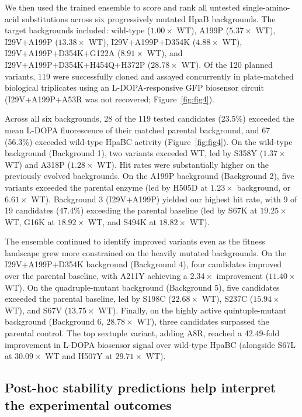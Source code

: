 \documentclass[sn-nature]{sn-jnl}
\begin{document}
We then used the trained ensemble to score and rank all untested single-amino-acid substitutions across six progressively mutated HpaB backgrounds. The target backgrounds included: wild-type ($1.00\times$ WT), A199P ($5.37\times$ WT), I29V+A199P ($13.38\times$ WT), I29V+A199P+D354K ($4.88\times$ WT), I29V+A199P+D354K+G122A ($8.91\times$ WT), and I29V+A199P+D354K+H454Q+H372P ($28.78\times$ WT). Of the 120 planned variants, 119 were successfully cloned and assayed concurrently in plate-matched biological triplicates using an L-DOPA-responsive GFP biosensor circuit (I29V+A199P+A53R was not recovered; Figure~\ref{fig:fig4}).

Across all six backgrounds, 28 of the 119 tested candidates (23.5\%) exceeded the mean L-DOPA fluorescence of their matched parental background, and 67 (56.3\%) exceeded wild-type HpaBC activity (Figure~\ref{fig:fig4}). On the wild-type background (Background 1), two variants exceeded WT, led by S358Y ($1.37\times$ WT) and A318P ($1.28\times$ WT). Hit rates were substantially higher on the previously evolved backgrounds. On the A199P background (Background 2), five variants exceeded the parental enzyme (led by H505D at $1.23\times$ background, or $6.61\times$ WT). Background 3 (I29V+A199P) yielded our highest hit rate, with 9 of 19 candidates (47.4\%) exceeding the parental baseline (led by S67K at $19.25\times$ WT, G16K at $18.92\times$ WT, and S494K at $18.82\times$ WT).

The ensemble continued to identify improved variants even as the fitness landscape grew more constrained on the heavily mutated backgrounds. On the I29V+A199P+D354K background (Background 4), four candidates improved over the parental baseline, with A211Y achieving a $2.34\times$ improvement ($11.40\times$ WT). On the quadruple-mutant background (Background 5), five candidates exceeded the parental baseline, led by S198C ($22.68\times$ WT), S237C ($15.94\times$ WT), and S67V ($13.75\times$ WT). Finally, on the highly active quintuple-mutant background (Background 6, $28.78\times$ WT), three candidates surpassed the parental control. The top sextuple variant, adding A8R, reached a 42.49-fold improvement in L-DOPA biosensor signal over wild-type HpaBC (alongside S67L at $30.09\times$ WT and H507Y at $29.71\times$ WT).

\subsection{Post-hoc stability predictions help interpret the experimental outcomes}
\end{document}
